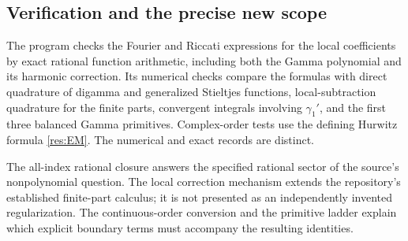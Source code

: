 \subsection{Verification and the precise new scope}

The program  checks the Fourier and
Riccati expressions for the local coefficients by exact rational
function arithmetic, including both the Gamma polynomial and its
harmonic correction. Its numerical checks compare the formulas with
direct quadrature of digamma and generalized Stieltjes functions,
local-subtraction quadrature for the finite parts, convergent
integrals involving $\gamma_1'$, and the first three balanced
Gamma primitives. Complex-order tests use the defining Hurwitz
formula \eqref{res:EM}. The numerical and exact records are distinct.

The all-index rational closure answers the specified rational sector
of the source's nonpolynomial question. The local correction
mechanism extends the repository's established finite-part calculus;
it is not presented as an independently invented regularization.
The continuous-order conversion and the primitive ladder explain
which explicit boundary terms must accompany the resulting identities.
